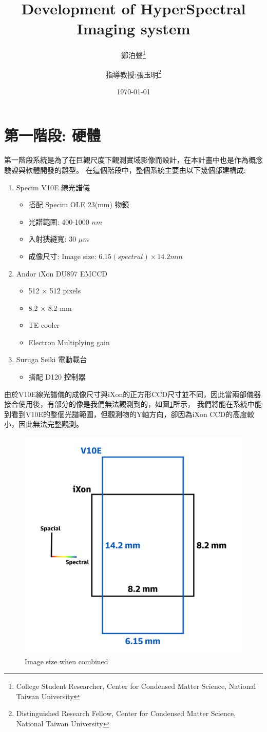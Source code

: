 \documentclass[12pt]{article}
\title{Development of HyperSpectral Imaging system}
\author{鄭泊聲\thanks{College Student Researcher, Center for Condensed Matter Science, National Taiwan University}
\and 指導教授:張玉明\thanks{Distinguished Research Fellow, Center for Condensed Matter Science, National Taiwan University}}
\date{\today}
\begin{document}
    \maketitle
    \tableofcontents
    \section{第一階段: 硬體}
    第一階段系統是為了在巨觀尺度下觀測實域影像而設計，在本計畫中也是作為概念驗證與軟體開發的雛型。
    在這個階段中，整個系統主要由以下幾個部建構成:
    \begin{enumerate}
        \item Specim V10E 線光譜儀
                \begin{itemize}
                    \item 搭配 Specim OLE 23(mm) 物鏡
                    \item 光譜範圍: 400-1000 $nm$
                    \item 入射狹縫寬: 30 $\mu m$
                    \item 成像尺寸: Image size: $6.15(spectral) \times 14.2 mm$
                \end{itemize}
        \item Andor iXon DU897 EMCCD
            \begin{itemize}
                \item 512 $\times$ 512 pixels
                \item 8.2 $\times$ 8.2 mm
                \item TE cooler
                \item Electron Multiplying gain
            \end{itemize}  
        \item Suruga Seiki 電動載台
                \begin{itemize}
                    \item 搭配 D120 控制器
                \end{itemize}
    \end{enumerate}
    由於V10E線光譜儀的成像尺寸與iXon的正方形CCD尺寸並不同，因此當兩部儀器接合使用後，有部分的像是我們無法觀測到的，如圖\ref{figure: image size}所示，
    我們將能在系統中能到看到V10E的整個光譜範圍，但觀測物的Y軸方向，卻因為iXon CCD的高度較小，因此無法完整觀測。

    \begin{figure}[t]
        \centering
        \includegraphics[width=0.5\linewidth]{imagesize.jpg}
        \caption{Image size when combined}
        \label{figure: image size}
    \end{figure}
\end{document}
